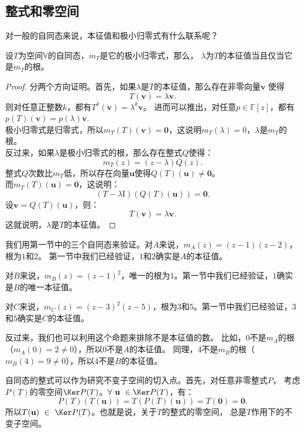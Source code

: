 \documentclass[12pt,UTF8]{ctexbook}
\begin{document}
\subsection{整式和零空间}
对一般的自同态来说，本征值和极小归零式有什么联系呢？
\begin{pp}\label{pp:6_3}
    设$T$为空间$\mathbb{V}$的自同态，$m_T$是它的极小归零式，那么，
    $\lambda$为$T$的本征值当且仅当它是$m_T$的根。
\end{pp}
\begin{proof} %
    分两个方向证明。首先，如果$\lambda$是$T$的本征值，那么存在非零向量$\mathbf{v}$
    使得
    $$ T(\mathbf{v}) = \lambda \mathbf{v}.$$
    则对任意正整数$k$，都有$T^k(\mathbf{v}) = \lambda^k \mathbf{v}$。
    进而可以推出，对任意$p\in\mathbb{F}[z]$，都有$p(T)(\mathbf{v}) = p(\lambda) \mathbf{v}.$\\
    极小归零式是归零式，所以$m_T(T)(\mathbf{v}) = \mathbf{0}$，这说明$m_T(\lambda) = 0$，$\lambda$是$m_T$的根。\\
    反过来，如果$\lambda$是极小归零式的根，那么存在整式$Q$使得：
    $$ m_T(z) = (z - \lambda)Q(z).$$
    整式$Q$次数比$m_T$低，所以存在向量$\mathbf{u}$使得$Q(T)(\mathbf{u}) \neq \mathbf{0}$。\\
    而$m_T(T)(\mathbf{u}) = \mathbf{0}$，这说明：
    $$ (T - \lambda \mathrm{I})(Q(T)(\mathbf{u})) = \mathbf{0}.$$
    设$\mathbf{v} = Q(T)(\mathbf{u})$，则：
    $$ T(\mathbf{v}) = \lambda \mathbf{v}.$$
    这就说明，$\lambda$是$T$的本征值。

\end{proof}

我们用第一节中的三个自同态来验证。对$A$来说，$m_A(z) = (z-1)(z-2)$，根为$1$和$2$。
第一节中我们已经验证，$1$和$2$确实是$A$的本征值。

对$B$来说，$m_B(z) = (z-1)^2$，唯一的根为$1$。第一节中我们已经验证，$1$确实是$B$的唯一本征值。

对$C$来说，$m_C(z) = (z-3)^2(z-5)$，根为$3$和$5$。第一节中我们已经验证，$3$和$5$确实是$C$的本征值。

反过来，我们也可以利用这个命题来排除不是本征值的数。
比如，$0$不是$m_A$的根（$m_A(0) = 2 \neq 0$），所以$0$不是$A$的本征值。
同理，$4$不是$m_B$的根（$m_B(4) = 9 \neq 0$），所以$4$不是$B$的本征值。

自同态的整式可以作为研究不变子空间的切入点。首先，对任意非零整式$P$，
考虑$P(T)$的零空间$\Ker P(T)$。$\forall \,\, \mathbf{u} \,\, \in \Ker P(T)$，有：
$$ P(T)(T(\mathbf{u})) = T(P(T)(\mathbf{u})) = T(\mathbf{0}) = \mathbf{0}.$$
所以$T(\mathbf{u})\,\,\in\,\,\Ker P(T)$。也就是说，关于$T$的整式的零空间，
总是$T$作用下的不变子空间。
\end{document}
